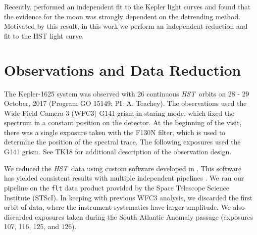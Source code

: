 \documentclass[twocolumn]{aastex62}
\newcommand{\project}[1]{\textsl{#1}}
\newcommand{\HST}{\project{HST}}
\newcommand{\Kepler}{\project{Kepler}}
\begin{document}
Recently, \cite{rodenbeck18} performed an independent fit to the Kepler light curves and found that the evidence for the moon was strongly dependent on the detrending method. Motivated by this result, in this work we perform an independent reduction and fit to the HST light curve.





\section{Observations and Data Reduction} \label{sec:data}
The Kepler-1625 system was observed with 26 continuous \HST\ orbits on 28 - 29 October, 2017 (Program GO 15149: PI: A. Teachey). The observations used the Wide Field Camera 3 (WFC3) G141 grism in staring mode, which fixed the spectrum in a constant position on the detector.  At the beginning of the visit, there was a single exposure taken with the F130N filter, which is used to determine the position of the spectral trace. The following exposures used the G141 grism.  See TK18 for additional description of the observation design.


We reduced the \HST\ data using custom software developed in \cite{kreidberg14a}.  This software has yielded consistent results with multiple independent pipelines \citep[e.g.][]{knutson14b, spake18}.  We ran our pipeline on the \texttt{flt} data product provided by the Space Telescope Science Institute (STScI).  In keeping with previous WFC3 analysis, we discarded the first orbit of data, where the instrument systematics have larger amplitude. We also discarded exposures taken during the South Atlantic Anomaly passage (exposures 107, 116, 125, and 126).
\end{document}
